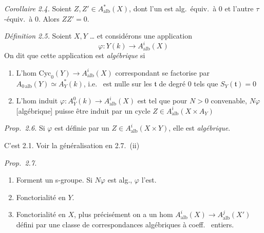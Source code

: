 \documentclass[11pt,a4paper]{article}
\begin{document}
\emph{Corollaire 2.4.} Soient $Z, Z' \in A^{*}_{\mathrm{alb}}(X)$, dont l'un
est alg.\ équiv.\ à $0$ et l'autre $\tau$-équiv.\ à $0$. Alors $ZZ' = 0$.

\emph{Définition 2.5.} Soient $X, Y$ … et considérons une application
\[
  \varphi : Y(k) \longrightarrow A^{i}_{\mathrm{alb}}(X)
\]
On dit que cette application est \emph{algébrique} si
\begin{enumerate}
  \item[1°)] L'hom  $\mathrm{Cyc}_{0}(Y) \to
  A^{i}_{\mathrm{alb}}(X)$ correspondant se factorise par
  $A_{0\,\mathrm{alb}}(Y) \simeq A^{*}_{Y}(k)$, i.e.\  est
  nulle sur les $\mathfrak{t}$ de degré $0$ tels que $S_{Y}(\mathfrak{t}) =
  0$
  \item[2°)] L'hom induit $\varphi : A^{0}_{Y}(k) \to
  A^{i}_{\mathrm{alb}}(X)$ est tel que pour $N > 0$ convenable, $N\varphi$
  [algébrique] puisse être induit par un cycle $Z \in
  A^{i}_{\mathrm{alb}}(X \times A_{Y})$
\end{enumerate}


\emph{Prop.\ 2.6.} Si $\varphi$ est définie par un $Z \in
A^{i}_{\mathrm{alb}}(X \times Y)$, elle est \emph{algébrique}.

C'est 2.1. Voir la généralisation en 2.7.\ (ii)

\emph{Prop.\ 2.7.}
\begin{enumerate}
  \item[(0)] Forment un s-groupe. Si $N\varphi$ est alg., $\varphi$ l'est.
  \item[(i)] Fonctorialité en $Y$. 
  \item[(ii)] Fonctorialité en $X$, plus précisément on a un hom
  $A^{i}_{\mathrm{alb}}(X) \to A^{j}_{\mathrm{alb}}(X')$ défini par une
  classe de correspondances algébriques à coeff.\ 
  entiers.
\end{enumerate}
\end{document}
